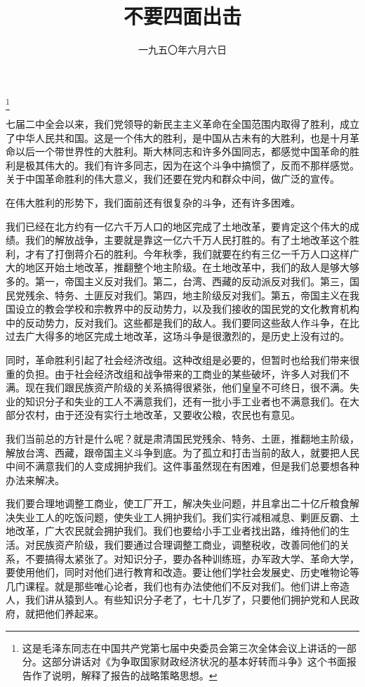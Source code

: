 
\title{不要四面出击}
\date{一九五〇年六月六日}
\thanks{这是毛泽东同志在中国共产党第七届中央委员会第三次全体会议上讲话的一部分。这部分讲话对《为争取国家财政经济状况的基本好转而斗争》这个书面报告作了说明，解释了报告的战略策略思想。}
\maketitle


七届二中全会以来，我们党领导的新民主主义革命在全国范围内取得了胜利，成立了中华人民共和国。这是一个伟大的胜利，是中国从古未有的大胜利，也是十月革命以后一个带世界性的大胜利。斯大林同志和许多外国同志，都感觉中国革命的胜利是极其伟大的。我们有许多同志，因为在这个斗争中搞惯了，反而不那样感觉。关于中国革命胜利的伟大意义，我们还要在党内和群众中间，做广泛的宣传。

在伟大胜利的形势下，我们面前还有很复杂的斗争，还有许多困难。

我们已经在北方约有一亿六千万人口的地区完成了土地改革，要肯定这个伟大的成绩。我们的解放战争，主要就是靠这一亿六千万人民打胜的。有了土地改革这个胜利，才有了打倒蒋介石的胜利。今年秋季，我们就要在约有三亿一千万人口这样广大的地区开始土地改革，推翻整个地主阶级。在土地改革中，我们的敌人是够大够多的。第一，帝国主义反对我们。第二，台湾、西藏的反动派反对我们。第三，国民党残余、特务、土匪反对我们。第四，地主阶级反对我们。第五，帝国主义在我国设立的教会学校和宗教界中的反动势力，以及我们接收的国民党的文化教育机构中的反动势力，反对我们。这些都是我们的敌人。我们要同这些敌人作斗争，在比过去广大得多的地区完成土地改革，这场斗争是很激烈的，是历史上没有过的。

同时，革命胜利引起了社会经济改组。这种改组是必要的，但暂时也给我们带来很重的负担。由于社会经济改组和战争带来的工商业的某些破坏，许多人对我们不满。现在我们跟民族资产阶级的关系搞得很紧张，他们皇皇不可终日，很不满。失业的知识分子和失业的工人不满意我们，还有一批小手工业者也不满意我们。在大部分农村，由于还没有实行土地改革，又要收公粮，农民也有意见。

我们当前总的方针是什么呢？就是肃清国民党残余、特务、土匪，推翻地主阶级，解放台湾、西藏，跟帝国主义斗争到底。为了孤立和打击当前的敌人，就要把人民中间不满意我们的人变成拥护我们。这件事虽然现在有困难，但是我们总要想各种办法来解决。

我们要合理地调整工商业，使工厂开工，解决失业问题，并且拿出二十亿斤粮食解决失业工人的吃饭问题，使失业工人拥护我们。我们实行减租减息、剿匪反霸、土地改革，广大农民就会拥护我们。我们也要给小手工业者找出路，维持他们的生活。对民族资产阶级，我们要通过合理调整工商业，调整税收，改善同他们的关系，不要搞得太紧张了。对知识分子，要办各种训练班，办军政大学、革命大学，要使用他们，同时对他们进行教育和改造。要让他们学社会发展史、历史唯物论等几门课程。就是那些唯心论者，我们也有办法使他们不反对我们。他们讲上帝造人，我们讲从猿到人。有些知识分子老了，七十几岁了，只要他们拥护党和人民政府，就把他们养起来。

